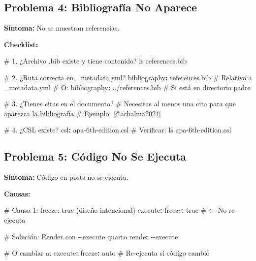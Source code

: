 \documentclass[
  doc,
  floatsintext,
  longtable,
  a4paper,
  nolmodern,
  notxfonts,
  notimes,
  12pt,
  colorlinks=true,linkcolor=blue,citecolor=blue,urlcolor=blue]{apa7}
\newenvironment{Shaded}{\begin{snugshade}}{\end{snugshade}}
\newcommand{\AttributeTok}[1]{\textcolor[rgb]{0.40,0.45,0.13}{#1}}
\newcommand{\CharTok}[1]{\textcolor[rgb]{0.13,0.47,0.30}{#1}}
\newcommand{\CommentTok}[1]{\textcolor[rgb]{0.37,0.37,0.37}{#1}}
\newcommand{\FunctionTok}[1]{\textcolor[rgb]{0.28,0.35,0.67}{#1}}
\newcommand{\KeywordTok}[1]{\textcolor[rgb]{0.00,0.23,0.31}{\textbf{#1}}}
\begin{document}
\subsection{Problema 4: Bibliografía No
Aparece}\label{problema-4-bibliografuxeda-no-aparece}

\textbf{Síntoma:} No se muestran referencias.

\textbf{Checklist:}

\begin{Shaded}
\begin{Highlighting}[]
\CommentTok{\# 1. ¿Archivo .bib existe y tiene contenido?}
\AttributeTok{ls references.bib}

\CommentTok{\# 2. ¿Ruta correcta en \_metadata.yml?}
\FunctionTok{bibliography}\KeywordTok{:}\AttributeTok{ references.bib}\CommentTok{      \# Relativo a \_metadata.yml}
\CommentTok{\# O:}
\FunctionTok{bibliography}\KeywordTok{:}\AttributeTok{ ../references.bib}\CommentTok{   \# Si está en directorio padre}

\CommentTok{\# 3. ¿Tienes citas en el documento?}
\CommentTok{\# Necesitas al menos una cita para que aparezca la bibliografía}
\CommentTok{\# Ejemplo: [@achalma2024]}

\CommentTok{\# 4. ¿CSL existe?}
\FunctionTok{csl}\KeywordTok{:}\AttributeTok{ apa{-}6th{-}edition.csl}
\CommentTok{\# Verificar:}
\AttributeTok{ls apa{-}6th{-}edition.csl}
\end{Highlighting}
\end{Shaded}

\subsection{Problema 5: Código No Se
Ejecuta}\label{problema-5-cuxf3digo-no-se-ejecuta}

\textbf{Síntoma:} Código en posts no se ejecuta.

\textbf{Causas:}

\begin{Shaded}
\begin{Highlighting}[]
\CommentTok{\# Causa 1: freeze: true (diseño intencional)}
\FunctionTok{execute}\KeywordTok{:}
\AttributeTok{  }\FunctionTok{freeze}\KeywordTok{:}\AttributeTok{ }\CharTok{true}\CommentTok{        \# ← No re{-}ejecuta}

\CommentTok{\# Solución: Render con {-}{-}execute}
\AttributeTok{quarto render {-}{-}execute}

\CommentTok{\# O cambiar a:}
\FunctionTok{execute}\KeywordTok{:}
\AttributeTok{  }\FunctionTok{freeze}\KeywordTok{:}\AttributeTok{ auto}\CommentTok{        \# Re{-}ejecuta si código cambió}
\end{Highlighting}
\end{Shaded}
\end{document}
